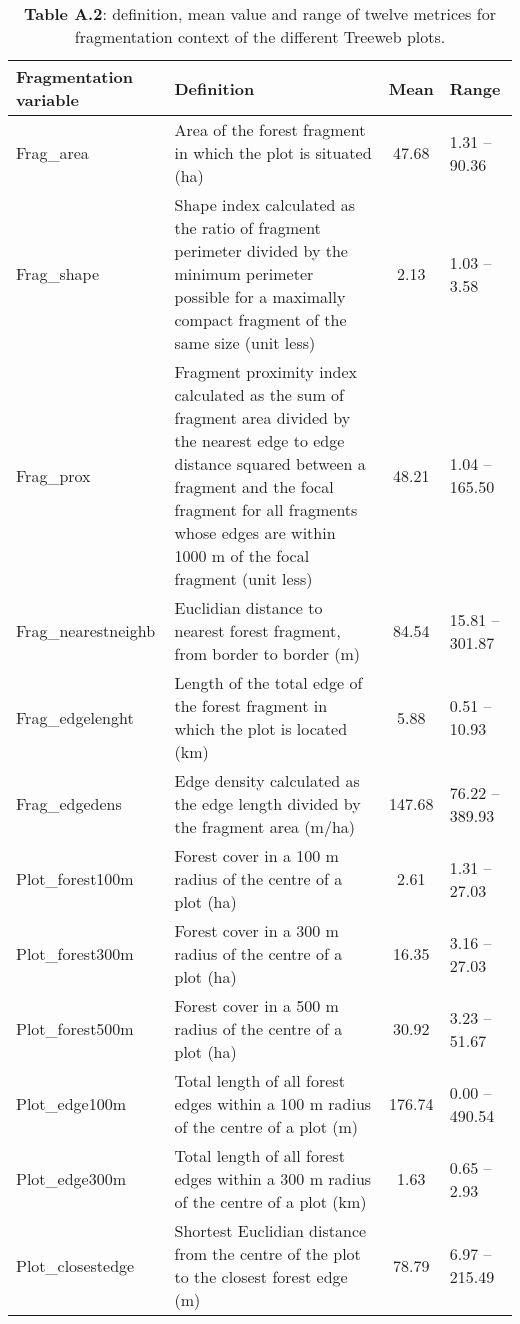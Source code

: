 \documentclass[10pt, twoside]{book} %
\begin{document}
\clearpage
	\begin{table}
		\begin{center}
			\begin{footnotesize}
				\caption*{\textbf{Table A.2}: definition, mean value and range of twelve metrices for fragmentation context of the different Treeweb plots.}  \label{TabA2}
				
				\begingroup
				\setlength{\tabcolsep}{10pt} %
				\renewcommand{\arraystretch}{1.5} %
				\begin{tabular}{p{2cm} p{6cm} c l}
					
					\toprule
					\textbf{Fragmentation variable} & \textbf{Definition} & \textbf{Mean} & \textbf{Range} \\
					\hline
					Frag\_area & Area of the forest fragment in which the plot is situated (ha) & 47.68 & 1.31 -- 90.36\\
					Frag\_shape & Shape index calculated as the ratio of fragment perimeter divided by the minimum perimeter possible for a maximally compact fragment of the same size (unit less) & 2.13 & 1.03 -- 3.58\\
					Frag\_prox & Fragment proximity index calculated as the sum of fragment area divided by the nearest edge to edge distance squared between a fragment and the focal fragment for all fragments whose edges are within 1000 m of the focal fragment (unit less) & 48.21 & 1.04 -- 165.50\\
					Frag\_nearestneighb & Euclidian distance to nearest forest fragment, from border to border (m) & 84.54 & 15.81 -- 301.87\\
					Frag\_edgelenght & Length of the total edge of the forest fragment in which the plot is located (km) & 5.88 & 0.51 -- 10.93\\
					Frag\_edgedens & Edge density calculated as the edge length divided by the fragment area (m/ha) & 147.68 & 76.22 -- 389.93\\
					Plot\_forest100m & Forest cover in a 100 m radius of the centre of a plot (ha) & 2.61 & 1.31 -- 27.03\\
					Plot\_forest300m & Forest cover in a 300 m radius of the centre of a plot (ha) & 16.35 & 3.16 -- 27.03\\
					Plot\_forest500m & Forest cover in a 500 m radius of the centre of a plot (ha) & 30.92 & 3.23 -- 51.67\\
					Plot\_edge100m & Total length of all forest edges within a 100 m radius of the centre of a plot (m) & 176.74 & 0.00 -- 490.54\\
					Plot\_edge300m & Total length of all forest edges within a 300 m radius of the centre of a plot (km) & 1.63 & 0.65 -- 2.93\\
					Plot\_closestedge & Shortest Euclidian distance from the centre of the plot to the closest forest edge (m) & 78.79 & 6.97 -- 215.49\\
					

\end{tabular}
\end{footnotesize}
\end{center}
\end{table}
\end{document}
